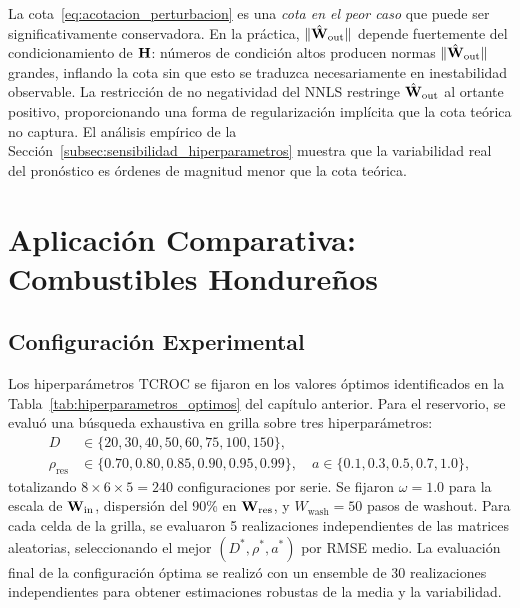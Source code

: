 \begin{remark}
\label{obs:cota_conservadora}
La cota~\eqref{eq:acotacion_perturbacion} es una \emph{cota en el
peor caso} que puede ser significativamente conservadora.  En la
práctica, $\|\hat{\mathbf{W}}_{\text{out}}\|$ depende fuertemente
del condicionamiento de $\mathbf{H}$: números de condición altos
producen normas $\|\hat{\mathbf{W}}_{\text{out}}\|$ grandes,
inflando la cota sin que esto se traduzca necesariamente en
inestabilidad observable.  La restricción de no negatividad del NNLS
restringe $\hat{\mathbf{W}}_{\text{out}}$ al ortante positivo,
proporcionando una forma de regularización implícita que la cota
teórica no captura.  El análisis empírico de la
Sección~\ref{subsec:sensibilidad_hiperparametros} muestra que la
variabilidad real del pronóstico es órdenes de magnitud menor que
la cota teórica.
\end{remark}

\section{Aplicación Comparativa: Combustibles Hondureños}
\label{sec:ssrc_aplicacion}

\subsection{Configuración Experimental}
\label{subsec:ssrc_configuracion}

Los hiperparámetros TCROC se fijaron en los valores óptimos
identificados en la Tabla~\ref{tab:hiperparametros_optimos} del
capítulo anterior.  Para el reservorio, se evaluó una búsqueda
exhaustiva en grilla sobre tres hiperparámetros:
\begin{align}
    D &\in \{20, 30, 40, 50, 60, 75, 100, 150\}, \nonumber\\
    \rho_{\text{res}} &\in \{0.70, 0.80, 0.85, 0.90, 0.95, 0.99\}, \quad
    a \in \{0.1, 0.3, 0.5, 0.7, 1.0\},
    \label{eq:grilla_ssrc}
\end{align}
totalizando $8 \times 6 \times 5 = 240$ configuraciones por serie.
Se fijaron $\omega = 1.0$ para la escala de $\mathbf{W}_{\text{in}}$,
dispersión del 90\% en $\mathbf{W}_{\text{res}}$, y
$W_{\text{wash}} = 50$ pasos de washout.  Para cada celda de la
grilla, se evaluaron 5 realizaciones independientes de las matrices
aleatorias, seleccionando el mejor $(D^*, \rho^*, a^*)$ por RMSE
medio.  La evaluación final de la configuración óptima se realizó
con un ensemble de 30 realizaciones independientes para obtener
estimaciones robustas de la media y la variabilidad.

